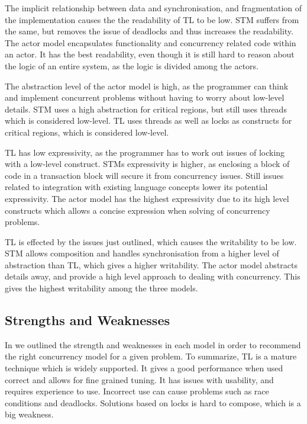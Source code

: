 The implicit relationship between data and synchronisation, and fragmentation of the implementation causes the the readability of \ac{TL} to be low. \ac{STM} suffers from the same, but removes the issue of deadlocks and thus increases the readability. The actor model encapsulates functionality and concurrency related code within an actor. It has the best readability, even though it is still hard to reason about the logic of an entire system, as the logic is divided among the actors.

The abstraction level of the actor model is high, as the programmer can think and implement concurrent problems without having to worry about low-level details. \ac{STM} uses a high abstraction for critical regions, but still uses threads which is considered low-level. \ac{TL} uses threads as well as locks as constructs for critical regions, which is considered low-level.  

\ac{TL} has low expressivity, as the programmer has to work out issues of locking with a low-level construct. \acp{STM} expressivity is higher, as enclosing a block of code in a transaction block will secure it from concurrency issues. Still issues related to integration with existing language concepts lower its potential expressivity. The actor model has the highest expressivity due to its high level constructs which allows a concise expression when solving of concurrency problems.

\ac{TL} is effected by the issues just outlined, which causes the writability to be low. \ac{STM} allows composition and handles synchronisation from a higher level of abstraction than \ac{TL}, which gives a higher writability. The actor model abstracts details away, and provide a high level approach to dealing with concurrency. This gives the highest writability among the three models.

\subsection{Strengths and Weaknesses}
In  we outlined the strength and weaknesses in each model in order to recommend the right concurrency model for a given problem. To summarize, \ac{TL} is a mature technique which is widely supported. It gives a good performance when used correct and allows for fine grained tuning. It has issues with usability, and requires experience to use. Incorrect use can cause problems such as race conditions and deadlocks. Solutions based on locks is hard to compose, which is a big weakness.

